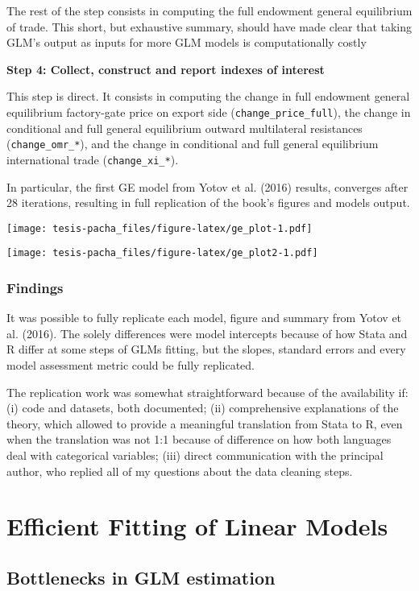 \documentclass[12pt,reqno,oneside,pdftex]{formato-puc/puctesis} %
\begin{document}
The rest of the step consists in computing the full endowment general
equilibrium of trade. This short, but exhaustive summary, should have
made clear that taking GLM's output as inputs for more GLM models is
computationally costly

\textbf{Step 4: Collect, construct and report indexes of interest}

This step is direct. It consists in computing the change in full
endowment general equilibrium factory-gate price on export side
(\texttt{change\_price\_full}), the change in conditional and full
general equilibrium outward multilateral resistances
(\texttt{change\_omr\_*}), and the change in conditional and full
general equilibrium international trade (\texttt{change\_xi\_*}).

In particular, the first GE model from Yotov et al. (2016) results,
converges after 28 iterations, resulting in full replication of the
book's figures and models output.

\texttt{[image: tesis-pacha\_files/figure-latex/ge\_plot-1.pdf]}

\texttt{[image: tesis-pacha\_files/figure-latex/ge\_plot2-1.pdf]}

\hypertarget{findings}{%
\subsection{Findings}\label{findings}}

It was possible to fully replicate each model, figure and summary from
Yotov et al. (2016). The solely differences were model intercepts
because of how Stata and R differ at some steps of GLMs fitting, but the
slopes, standard errors and every model assessment metric could be fully
replicated.

The replication work was somewhat straightforward because of the
availability if: (i) code and datasets, both documented; (ii)
comprehensive explanations of the theory, which allowed to provide a
meaningful translation from Stata to R, even when the translation was
not 1:1 because of difference on how both languages deal with
categorical variables; (iii) direct communication with the principal
author, who replied all of my questions about the data cleaning steps.

\chapter{Efficient Fitting of Linear Models}

\hypertarget{bottlenecks-in-glm-estimation}{%
\section{Bottlenecks in GLM
estimation}\label{bottlenecks-in-glm-estimation}}
\end{document}
